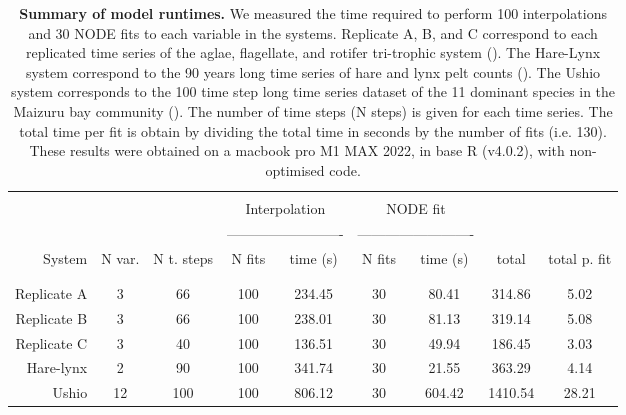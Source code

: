 \documentclass[11pt, oneside]{article}
\begin{document}
\newpage
\begin{table}[H]
\begin{center}
\caption{
\textbf{Summary of model runtimes.}
We measured the time required to perform 100 interpolations and 30 NODE fits to each variable in the systems.
Replicate A, B, and C correspond to each replicated time series of the aglae, flagellate, and rotifer tri-trophic system (\cite{Hiltunen2013}).
The Hare-Lynx system correspond to the 90 years long time series of hare and lynx pelt counts (\cite{Odum1972}).
    The Ushio system corresponds to the 100 time step long time series dataset of the 11 dominant species in the Maizuru bay community (\cite{Ushio2018}).
The number of time steps (N steps) is given for each time series. 
The total time per fit is obtain by dividing the total time in seconds by the number of fits (i.e. 130).
These results were obtained on a macbook pro M1 MAX 2022, in base R (v4.0.2), with non-optimised code.
}
\begin{tabular}{rcccccccc}
\hline
& \\
& & & \multicolumn{2}{c}{Interpolation} & \multicolumn{2}{c}{NODE fit} & &  \\
& & & \multicolumn{2}{c}{-------------------------} & \multicolumn{2}{c}{-------------------------} & &  \\
System & N var. & N t. steps & N fits & time (s) & N fits & time (s) & total & total p. fit \\
& \\
\hline
& \\
Replicate A & 3  &  66 &  100 & 234.45 & 30 &  80.41 &  314.86 &  5.02 \\
Replicate B & 3  &  66 &  100 & 238.01 & 30 &  81.13 &  319.14 &  5.08 \\
Replicate C & 3  &  40 &  100 & 136.51 & 30 &  49.94 &  186.45 &  3.03 \\
Hare-lynx   & 2  &  90 &  100 & 341.74 & 30 &  21.55 &  363.29 &  4.14 \\
Ushio       & 12 & 100 &  100 & 806.12 & 30 & 604.42 & 1410.54 & 28.21 \\
\end{tabular}
\end{center}
\end{table}
\newpage
\end{document}
